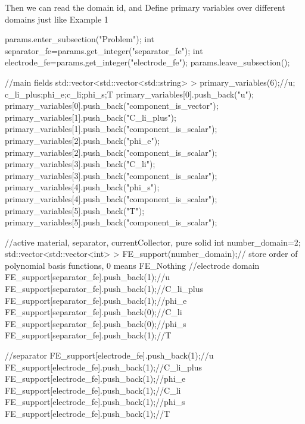  Then we can read the domain id, and Define primary variables over different domains just like Example 1 
\begin{DoxyCode}
params.enter\_subsection(\textcolor{stringliteral}{"Problem"}); 
\textcolor{keywordtype}{int} separator\_fe=params.get\_integer(\textcolor{stringliteral}{"separator\_fe"});
\textcolor{keywordtype}{int} electrode\_fe=params.get\_integer(\textcolor{stringliteral}{"electrode\_fe"});
params.leave\_subsection();

\textcolor{comment}{//main fields }
std::vector<std::vector<std::string> > primary\_variables(6);\textcolor{comment}{//u; c\_li\_plus;phi\_e;c\_li;phi\_s;T   }
primary\_variables[0].push\_back(\textcolor{stringliteral}{"u"}); primary\_variables[0].push\_back(\textcolor{stringliteral}{"component\_is\_vector"});
primary\_variables[1].push\_back(\textcolor{stringliteral}{"C\_li\_plus"}); primary\_variables[1].push\_back(\textcolor{stringliteral}{"component\_is\_scalar"});
primary\_variables[2].push\_back(\textcolor{stringliteral}{"phi\_e"}); primary\_variables[2].push\_back(\textcolor{stringliteral}{"component\_is\_scalar"});
primary\_variables[3].push\_back(\textcolor{stringliteral}{"C\_li"}); primary\_variables[3].push\_back(\textcolor{stringliteral}{"component\_is\_scalar"});
primary\_variables[4].push\_back(\textcolor{stringliteral}{"phi\_s"}); primary\_variables[4].push\_back(\textcolor{stringliteral}{"component\_is\_scalar"});
primary\_variables[5].push\_back(\textcolor{stringliteral}{"T"}); primary\_variables[5].push\_back(\textcolor{stringliteral}{"component\_is\_scalar"});

\textcolor{comment}{//active material, separator, currentCollector, pure solid}
\textcolor{keywordtype}{int} number\_domain=2;
std::vector<std::vector<int> > FE\_support(number\_domain);\textcolor{comment}{// store order of polynomial basis functions, 0
       means FE\_Nothing   }
\textcolor{comment}{//electrode domain}
FE\_support[separator\_fe].push\_back(1);\textcolor{comment}{//u}
FE\_support[separator\_fe].push\_back(1);\textcolor{comment}{//C\_li\_plus}
FE\_support[separator\_fe].push\_back(1);\textcolor{comment}{//phi\_e}
FE\_support[separator\_fe].push\_back(0);\textcolor{comment}{//C\_li}
FE\_support[separator\_fe].push\_back(0);\textcolor{comment}{//phi\_s}
FE\_support[separator\_fe].push\_back(1);\textcolor{comment}{//T}

\textcolor{comment}{//separator}
FE\_support[electrode\_fe].push\_back(1);\textcolor{comment}{//u}
FE\_support[electrode\_fe].push\_back(1);\textcolor{comment}{//C\_li\_plus}
FE\_support[electrode\_fe].push\_back(1);\textcolor{comment}{//phi\_e}
FE\_support[electrode\_fe].push\_back(1);\textcolor{comment}{//C\_li}
FE\_support[electrode\_fe].push\_back(1);\textcolor{comment}{//phi\_s}
FE\_support[electrode\_fe].push\_back(1);\textcolor{comment}{//T}
\end{DoxyCode}
